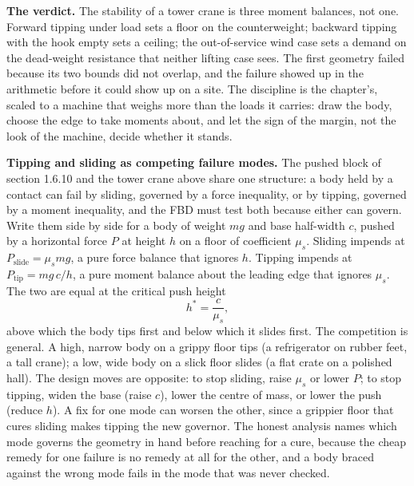 \textbf{The verdict.} The stability of a tower crane is three moment balances,
not one. Forward tipping under load sets a floor on the counterweight; backward
tipping with the hook empty sets a ceiling; the out-of-service wind case sets a
demand on the dead-weight resistance that neither lifting case sees. The first
geometry failed because its two bounds did not overlap, and the failure showed
up in the arithmetic before it could show up on a site. The discipline is the
chapter's, scaled to a machine that weighs more than the loads it carries: draw
the body, choose the edge to take moments about, and let the sign of the margin,
not the look of the machine, decide whether it stands.

\begin{mastery}
\textbf{Tipping and sliding as competing failure modes.} The pushed block of
section 1.6.10 and the tower crane above share one structure: a body held by a
contact can fail by sliding, governed by a force inequality, or by tipping,
governed by a moment inequality, and the FBD must test both because either can
govern. Write them side by side for a body of weight $mg$ and base half-width
$c$, pushed by a horizontal force $P$ at height $h$ on a floor of coefficient
$\mu_s$. Sliding impends at $P_{\text{slide}} = \mu_s mg$, a pure force
balance that ignores $h$. Tipping impends at $P_{\text{tip}} = mg\,c/h$, a
pure moment balance about the leading edge that ignores $\mu_s$. The two are
equal at the critical push height
\[
h^\ast = \frac{c}{\mu_s},
\]
above which the body tips first and below which it slides first. The
competition is general. A high, narrow body on a grippy floor tips (a
refrigerator on rubber feet, a tall crane); a low, wide body on a slick floor
slides (a flat crate on a polished hall). The design moves are opposite: to
stop sliding, raise $\mu_s$ or lower $P$; to stop tipping, widen the base
(raise $c$), lower the centre of mass, or lower the push (reduce $h$). A fix
for one mode can worsen the other, since a grippier floor that cures sliding
makes tipping the new governor. The honest analysis names which mode governs
the geometry in hand before reaching for a cure, because the cheap remedy for
one failure is no remedy at all for the other, and a body braced against the
wrong mode fails in the mode that was never checked.
\end{mastery}

